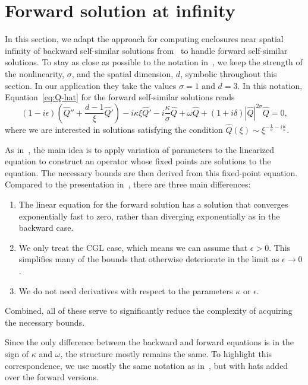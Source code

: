 \documentclass[11pt]{article}
\begin{document}
\section{Forward solution at infinity}
\label{sec:forward-solution-infinity}

In this section, we adapt the approach for computing enclosures near
spatial infinity of backward self-similar solutions
from~\cite[Section~7]{Dahne2024} to handle forward self-similar
solutions. To stay as close as possible to the notation
in~\cite{Dahne2024}, we keep the strength of the nonlinearity,
\(\sigma\), and the spatial dimension, \(d\), symbolic throughout this
section. In our application they take the values \(\sigma = 1\) and
\(d = 3\). In this notation, Equation~\eqref{eq:Q-hat} for the
forward self-similar solutions reads
\begin{equation}\label{eq:Q-hat-infty-equation}
  (1 - i\epsilon)\left(\hat{Q}'' + \frac{d - 1}{\xi}\hat{Q}'\right) - i\kappa\xi \hat{Q}'
  - i \frac{\kappa}{\sigma}\hat{Q} + \omega \hat{Q} + (1 + i\delta)|\hat{Q}|^{2\sigma}\hat{Q} = 0,
\end{equation}
where we are interested in solutions satisfying the condition
\(\hat{Q}(\xi) \sim \xi^{-\frac{1}{\sigma} - i\frac{\omega}{\kappa}}\).

As in~\cite{Dahne2024}, the main idea is to apply variation of
parameters to the linearized equation to construct an operator whose
fixed points are solutions to the equation. The necessary bounds are
then derived from this fixed-point equation. Compared to the
presentation in~\cite{Dahne2024}, there are three main differences:
\begin{enumerate}
\item The linear equation for the forward solution has a solution that
  converges exponentially fast to zero, rather than diverging
  exponentially as in the backward case.
\item We only treat the CGL case, which means we can assume that
  \(\epsilon > 0\). This simplifies many of the bounds that otherwise
  deteriorate in the limit as \(\epsilon \to 0\).
\item We do not need derivatives with respect to the parameters
  \(\kappa\) or \(\epsilon\).
\end{enumerate}
Combined, all of these serve to significantly reduce the complexity of
acquiring the necessary bounds.

Since the only difference between the backward and forward equations is
in the sign of \(\kappa\) and \(\omega\), the structure mostly remains
the same. To highlight this correspondence, we use mostly the same
notation as in~\cite{Dahne2024}, but with hats added over the forward
versions.
\end{document}
